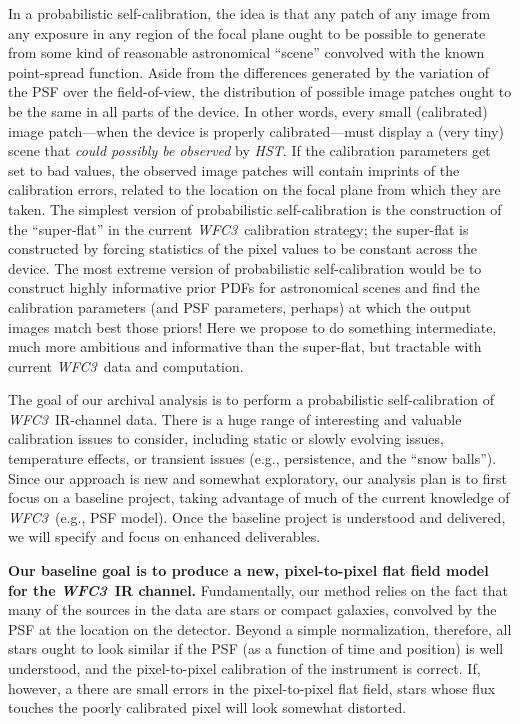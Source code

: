 \documentclass[12pt]{article}
\newcommand{\project}[1]{\textsl{#1}}
\newcommand{\HST}{\project{HST}}
\newcommand{\WFC}{\project{WFC3}}
\begin{document}
In a probabilistic self-calibration, the idea is that any patch of any
image from any exposure in any region of the focal plane ought to be
possible to generate from some kind of reasonable astronomical
``scene'' convolved with the known point-spread function.  Aside from
the differences generated by the variation of the PSF over the
field-of-view, the distribution of possible image patches ought to be
the same in all parts of the device.  In other words, every small
(calibrated) image patch---when the device is properly
calibrated---must display a (very tiny) scene that \emph{could
  possibly be observed} by \HST.  If the calibration parameters get
set to bad values, the observed image patches will contain imprints of
the calibration errors, related to the location on the focal plane
from which they are taken.  The simplest version of probabilistic
self-calibration is the construction of the ``super-flat'' in the
current \WFC\ calibration strategy; the super-flat is constructed by
forcing statistics of the pixel values to be constant across the
device.  The most extreme version of probabilistic self-calibration
would be to construct highly informative prior PDFs for astronomical
scenes and find the calibration parameters (and PSF parameters,
perhaps) at which the output images match best those priors!  Here we
propose to do something intermediate, much more ambitious and
informative than the super-flat, but tractable with current \WFC\ data
and computation.

%
\describearchival       %

The goal of our archival analysis is to perform a probabilistic
self-calibration of \WFC\ IR-channel data.  There is a huge range of interesting
and valuable calibration issues to consider, including static or slowly 
evolving issues, temperature effects, or transient
issues (e.g., persistence, and the ``snow balls'').  Since our approach is
new and somewhat exploratory, our analysis plan is to first focus on
a baseline project, taking advantage of much of the current
knowledge of \WFC\ (e.g., PSF model).  Once the baseline project is understood
and delivered, we will specify and focus on enhanced deliverables.

\textbf{Our baseline goal is to produce a new, pixel-to-pixel
  flat field model for the \WFC\ IR channel.}
Fundamentally, our method relies on the fact
that many of the sources in the data are stars or compact galaxies, convolved by the PSF at
the location on the detector.  Beyond a simple normalization,
therefore, all stars ought to look similar if the PSF (as a
function of time and position) is well understood, and the
pixel-to-pixel calibration of the instrument is correct.  If, however,
a there are small errors in the pixel-to-pixel flat field, stars whose flux
touches the poorly calibrated pixel will look somewhat distorted.
\end{document}
